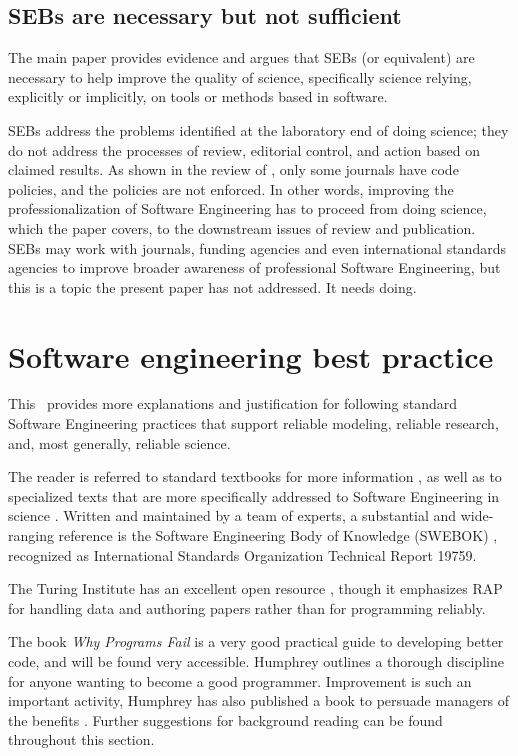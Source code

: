\documentclass[10pt,a4paper]{article}
\begin{document}
\subsection{SEBs are necessary but not sufficient}
The main paper provides evidence and argues that SEBs (or equivalent) are necessary to help improve the quality of science, specifically science relying, explicitly or implicitly, on tools or methods based in software. 

SEBs address the problems identified at the laboratory end of doing science; they do not address the processes of review, editorial control, and action based on claimed results. As shown in the review of , only some journals have code policies, and the policies are not enforced. In other words, improving the professionalization of Software Engineering has to proceed from doing science, which the paper covers, to the downstream issues of review and publication. SEBs may work with journals, funding agencies and even international standards agencies to improve broader awareness of professional Software Engineering, but this is a topic the present paper has not addressed. It needs doing.

\section{Software engineering best practice}
\label{supplement-best-practice}

This \supplement\ provides more explanations and justification for following standard Software Engineering practices that support reliable modeling, reliable research, and, most generally, reliable science. 

The reader is referred to standard textbooks for more information , as well as to specialized texts that are more specifically addressed to Software Engineering in science . Written and maintained by a team of experts, a substantial and wide-ranging reference is the Software Engineering Body of Knowledge (SWEBOK) \cite{swebok}, recognized as International Standards Organization Technical Report 19759.

The Turing Institute has an excellent open resource \cite{turing-way}, though it emphasizes RAP for handling data and authoring papers rather than for programming reliably.

The book \emph{Why Programs Fail\/} \cite{wpf} is a very good practical guide to developing better code, and will be found very accessible. Humphrey \cite{humphrey} outlines a thorough discipline for anyone wanting to become a good programmer. Improvement is such an important activity, Humphrey has also published a book to persuade managers of the benefits \cite{managers}. Further suggestions for background reading can be found throughout this section.
\end{document}

